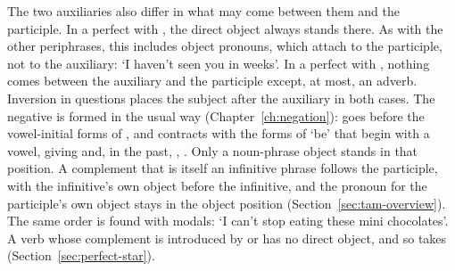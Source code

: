 The two auxiliaries also differ in what may come between them and the participle. In a perfect with , the direct object always stands there. As with the other periphrases, this includes object pronouns, which attach to the participle, not to the auxiliary:  `I haven't seen you in weeks'. In a perfect with , nothing comes between the auxiliary and the participle except, at most, an adverb. Inversion in questions places the subject after the auxiliary in both cases. The negative is formed in the usual way (Chapter~\ref{ch:negation}):  goes before the vowel-initial forms of , and  contracts with the forms of `be' that begin with a vowel, giving  and, in the past, , .
Only a noun-phrase object stands in that position. A complement that is itself an infinitive phrase follows the participle, with the infinitive's own object before the infinitive, and the pronoun for the participle's own object stays in the object position (Section~\ref{sec:tam-overview}).
The same order is found with modals:  `I can't stop eating these mini chocolates'. A verb whose complement is introduced by  or  has no direct object, and so takes  (Section~\ref{sec:perfect-star}).

